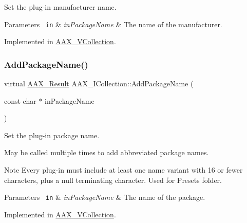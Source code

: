 Set the plug-\/in manufacturer name. 


\begin{DoxyParams}[1]{Parameters}
\mbox{\texttt{ in}}  & {\em in\+Package\+Name} & The name of the manufacturer. \\
\hline
\end{DoxyParams}


Implemented in \mbox{\hyperlink{a01897_a34a70df2b1c4a6b2c13cbee18e463341}{A\+A\+X\+\_\+\+V\+Collection}}.

\mbox{\label{a01777_acf7410e0d06cf64bea36bf7d18b3456c}} 
\subsubsection{\texorpdfstring{AddPackageName()}{AddPackageName()}}
{\footnotesize\ttfamily virtual \mbox{\hyperlink{a00392_a4d8f69a697df7f70c3a8e9b8ee130d2f}{A\+A\+X\+\_\+\+Result}} A\+A\+X\+\_\+\+I\+Collection\+::\+Add\+Package\+Name (\begin{DoxyParamCaption}\item[{const char $\ast$}]{in\+Package\+Name }\end{DoxyParamCaption})\hspace{0.3cm}{\ttfamily [pure virtual]}}



Set the plug-\/in package name. 

May be called multiple times to add abbreviated package names.

\begin{DoxyNote}{Note}
Every plug-\/in must include at least one name variant with 16 or fewer characters, plus a null terminating character. Used for Presets folder.
\end{DoxyNote}

\begin{DoxyParams}[1]{Parameters}
\mbox{\texttt{ in}}  & {\em in\+Package\+Name} & The name of the package. \\
\hline
\end{DoxyParams}


Implemented in \mbox{\hyperlink{a01897_a20f5240a6e7c3f6b787fc6f6040f2258}{A\+A\+X\+\_\+\+V\+Collection}}.

\mbox{\label{a01777_a4e69ac93eaac9c285c2bc3ac5b25880b}} 
